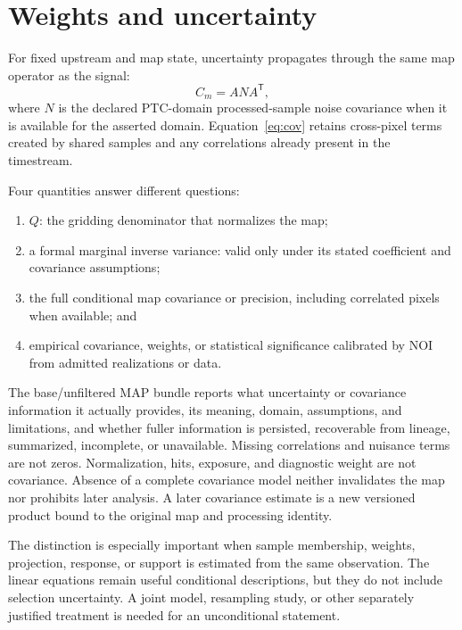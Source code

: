 \documentclass[10pt]{article}
\begin{document}
\clearpage
\section{Weights and uncertainty}\label{sec:uncertainty}
For fixed upstream and map state, uncertainty propagates through the same map
operator as the signal:
\begin{equation}
 C_m=A N A^{\mathsf T},
 \label{eq:cov}
\end{equation}
where \(N\) is the declared PTC-domain processed-sample noise covariance when
it is available for the asserted domain. Equation~\eqref{eq:cov}
retains cross-pixel terms created by shared samples and any correlations
already present in the timestream.

Four quantities answer different questions:
\begin{enumerate}
\item \(Q\): the gridding denominator that normalizes the map;
\item a formal marginal inverse variance: valid only under its stated
coefficient and covariance assumptions;
\item the full conditional map covariance or precision, including correlated
pixels when available; and
\item empirical covariance, weights, or statistical significance calibrated
by NOI from admitted realizations or data.
\end{enumerate}

The base/unfiltered MAP bundle reports what uncertainty or covariance information it
actually provides, its meaning, domain, assumptions, and limitations, and
whether fuller information is persisted, recoverable from lineage,
summarized, incomplete, or unavailable. Missing correlations and nuisance
terms are not zeros. Normalization, hits, exposure, and diagnostic weight are
not covariance. Absence of a complete covariance model neither invalidates the
map nor prohibits later analysis. A later covariance estimate is a new
versioned product bound to the original map and processing identity.

The distinction is especially important when sample membership, weights,
projection, response, or support is estimated from the same observation. The
linear equations remain useful conditional descriptions, but they do not
include selection uncertainty. A joint model, resampling study, or other
separately justified treatment is needed for an unconditional statement.
\end{document}
